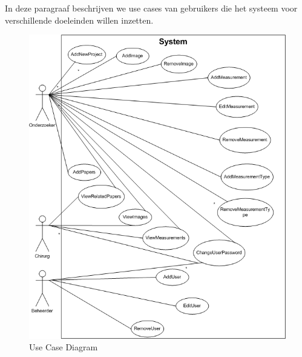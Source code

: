 In deze paragraaf beschrijven we use cases van gebruikers die het systeem voor verschillende doeleinden willen inzetten.
\begin{figure}[htp]
\begin{center}
	\includegraphics[scale=0.65]{UseCaseDiagram}
\caption{Use Case Diagram}
\label{default}
\end{center}
\end{figure}


